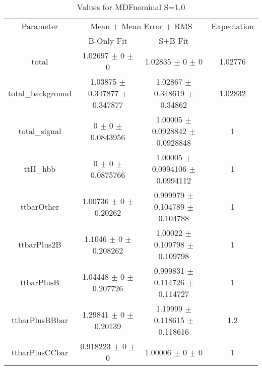 \begin{table}
\centering
\caption{Values for MDFnominal S=1.0}
\begin{tabular}{cccc}
\toprule
Parameter & \multicolumn{2}{c}{Mean $\pm$ Mean Error $\pm$ RMS} & Expectation\\
 & B-Only Fit & S+B Fit & \\
\midrule
total & \num{1.02697} $\pm$ \num{0} $\pm$ \num{0} & \num{1.02835} $\pm$ \num{0} $\pm$ \num{0} & \num{1.02776}\\
total\_background & \num{1.03875} $\pm$ \num{0.347877} $\pm$ \num{0.347877} & \num{1.02867} $\pm$ \num{0.348619} $\pm$ \num{0.34862} & \num{1.02832}\\
total\_signal & \num{0} $\pm$ \num{0} $\pm$ \num{0.0843956} & \num{1.00005} $\pm$ \num{0.0928842} $\pm$ \num{0.0928848} & \num{1}\\
ttH\_hbb & \num{0} $\pm$ \num{0} $\pm$ \num{0.0875766} & \num{1.00005} $\pm$ \num{0.0994106} $\pm$ \num{0.0994112} & \num{1}\\
ttbarOther & \num{1.00736} $\pm$ \num{0} $\pm$ \num{0.20262} & \num{0.999979} $\pm$ \num{0.104789} $\pm$ \num{0.104788} & \num{1}\\
ttbarPlus2B & \num{1.1046} $\pm$ \num{0} $\pm$ \num{0.208262} & \num{1.00022} $\pm$ \num{0.109798} $\pm$ \num{0.109798} & \num{1}\\
ttbarPlusB & \num{1.04448} $\pm$ \num{0} $\pm$ \num{0.207726} & \num{0.999831} $\pm$ \num{0.114726} $\pm$ \num{0.114727} & \num{1}\\
ttbarPlusBBbar & \num{1.29841} $\pm$ \num{0} $\pm$ \num{0.20139} & \num{1.19999} $\pm$ \num{0.118615} $\pm$ \num{0.118616} & \num{1.2}\\
ttbarPlusCCbar & \num{0.918223} $\pm$ \num{0} $\pm$ \num{0} & \num{1.00006} $\pm$ \num{0} $\pm$ \num{0} & \num{1}\\
\bottomrule
\end{tabular}
\end{table}